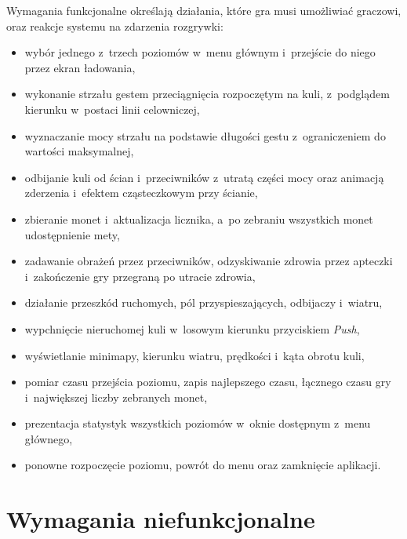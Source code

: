 Wymagania funkcjonalne określają działania, które gra musi umożliwiać graczowi, oraz
reakcje systemu na zdarzenia rozgrywki:
\begin{itemize}[leftmargin=1.9cm, itemsep=1pt]
  \item wybór jednego z~trzech poziomów w~menu głównym i~przejście do niego przez ekran
        ładowania,
  \item wykonanie strzału gestem przeciągnięcia rozpoczętym na kuli, z~podglądem kierunku
        w~postaci linii celowniczej,
  \item wyznaczanie mocy strzału na podstawie długości gestu z~ograniczeniem do wartości
        maksymalnej,
  \item odbijanie kuli od ścian i~przeciwników z~utratą części mocy oraz animacją
        zderzenia i~efektem cząsteczkowym przy ścianie,
  \item zbieranie monet i~aktualizacja licznika, a~po zebraniu wszystkich monet
        udostępnienie mety,
  \item zadawanie obrażeń przez przeciwników, odzyskiwanie zdrowia przez apteczki
        i~zakończenie gry przegraną po utracie zdrowia,
  \item działanie przeszkód ruchomych, pól przyspieszających, odbijaczy i~wiatru,
  \item wypchnięcie nieruchomej kuli w~losowym kierunku przyciskiem \emph{Push},
  \item wyświetlanie minimapy, kierunku wiatru, prędkości i~kąta obrotu kuli,
  \item pomiar czasu przejścia poziomu, zapis najlepszego czasu, łącznego czasu gry
        i~największej liczby zebranych monet,
  \item prezentacja statystyk wszystkich poziomów w~oknie dostępnym z~menu głównego,
  \item ponowne rozpoczęcie poziomu, powrót do menu oraz zamknięcie aplikacji.
\end{itemize}

\section{Wymagania niefunkcjonalne}

